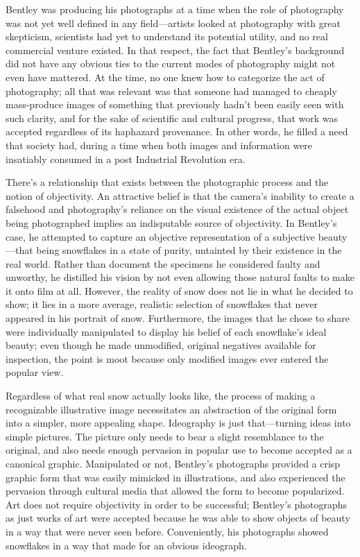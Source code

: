 Bentley was producing his photographs at a time when the role of photography was
not yet well defined in any field---artists looked at photography with great
skepticism, scientists had yet to understand its potential utility, and no real
commercial venture existed. In that respect, the fact that Bentley's background
did not have any obvious ties to the current modes of photography might not even
have mattered. At the time, no one knew how to categorize the act of
photography; all that was relevant was that someone had managed to cheaply
mass-produce images of something that previously hadn't been easily seen with
such clarity, and for the sake of scientific and cultural progress, that work
was accepted regardless of its haphazard provenance. In other words, he filled a
need that society had, during a time when both images and information were
insatiably consumed in a post Industrial Revolution era.

There's a relationship that exists between the photographic process and the
notion of objectivity. An attractive belief is that the camera's inability to
create a falsehood and photography's reliance on the visual existence of the
actual object being photographed implies an indisputable source of objectivity.
In Bentley's case, he attempted to capture an objective representation of a
subjective beauty---that being snowflakes in a state of purity, untainted by
their existence in the real world. Rather than document the specimens he
considered faulty and unworthy, he distilled his vision by not even allowing
those natural faults to make it onto film at all. However, the reality of snow
does not lie in what he decided to show; it lies in a more average, realistic
selection of snowflakes that never appeared in his portrait of snow.
Furthermore, the images that he chose to share were individually manipulated to
display his belief of each snowflake's ideal beauty; even though he made
unmodified, original negatives available for inspection, the point is moot
because only modified images ever entered the popular view.

Regardless of what real snow actually looks like, the process of making a
recognizable illustrative image necessitates an abstraction of the original form
into a simpler, more appealing shape. Ideography is just that---turning ideas
into simple pictures. The picture only needs to bear a slight resemblance to the
original, and also needs enough pervasion in popular use to become accepted as a
canonical graphic. Manipulated or not, Bentley's photographs provided a crisp
graphic form that was easily mimicked in illustrations, and also experienced the
pervasion through cultural media that allowed the form to become popularized.
Art does not require objectivity in order to be successful; Bentley's
photographs as just works of art were accepted because he was able to show
objects of beauty in a way that were never seen before. Conveniently, his
photographs showed snowflakes in a way that made for an obvious ideograph.

